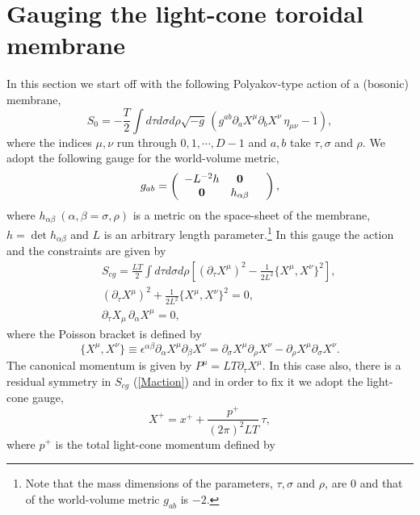 \documentclass[12pt,a4paper]{article}
\newcommand{\ptau}{\partial_\tau}
\newcommand{\psig}{\partial_\sigma}
\newcommand{\prho}{\partial_\rho}
\newcommand{\p}{\partial}
\begin{document}
\section{Gauging the light-cone toroidal membrane}\label{s:MEM}
In this section we start off with the following Polyakov-type action
of a (bosonic) membrane,
\begin{equation}
  S_0=-\frac{T}{2}\int d\tau d\sigma d\rho
  \sqrt{-g}\,(g^{ab}\p_{a} X^{\mu}\p_{b} X^{\nu}\,\eta_{\mu\nu}-1),
\end{equation}
where the indices $\mu,\nu$ run through $0,1,\cdots,D-1$ and $a,b$
take $\tau,\sigma$ and $\rho$.
We adopt the following gauge for the world-volume metric,
\begin{eqnarray}
  g_{ab}= \left(\begin{array}{cccc}
	-L^{-2}h&\bf0&\\
	\bf0 &h_{\alpha\beta}&
	\end{array}\right),
\end{eqnarray}
where $h_{\alpha\beta}~(\alpha,\beta=\sigma,\rho)$ is a metric on the
space-sheet of the membrane, $h=\det h_{\alpha\beta}$ and $L$ is an
arbitrary length parameter.\footnote{Note that the mass dimensions of
the parameters, $\tau,\sigma$ and $\rho$, are $0$ and that of the
world-volume metric $g_{ab}$ is $-2$.}
In this gauge the action and the constraints are given by
\begin{eqnarray}
  &&S_{cg}=\frac{LT}{2}\int d\tau d\sigma d\rho \left[(\ptau X^{\mu})^2
        -\frac{1}{2L^2}\{X^{\mu},X^{\nu}\}^2\right]\label{Maction},\\
  &&(\ptau X^{\mu})^2 +
	\frac{1}{2L^2}\{X^{\mu},X^{\nu}\}^2=0\label{MCons.2},\\
  &&\ptau X_{\mu}\,\p_{\alpha} X^{\mu}=0,\label{MCons.1}
\end{eqnarray}
where the Poisson bracket is defined by
\begin{equation}
  \{X^{\mu},X^{\nu}\}\equiv\epsilon^{\alpha\beta}\p_{\alpha}
	 X^{\mu}\p_{\beta} X^{\nu}=\psig X^{\mu}\prho X^{\nu}
	-\prho X^{\mu}\psig X^{\nu}.
\end{equation}
The canonical momentum is given by $P^{\mu}=LT\ptau X^{\mu}$.
In this case also, there is a residual symmetry in $S_{cg}$
(\ref{Maction}) and in order to fix it we adopt the light-cone gauge,
\begin{equation}
  X^{+}=x^+ + \frac{p^+}{(2\pi)^2 LT}\,\tau,
\end{equation}
where $p^{+}$ is the total light-cone momentum defined by
\end{document}
